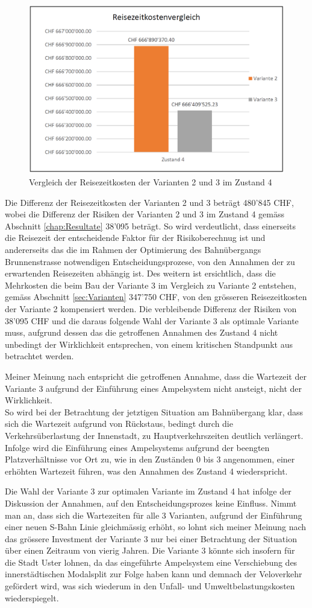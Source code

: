\begin{figure}[h!]
	\centering
	\includegraphics[width=.45\textwidth]{figures/f-06-07-ReisezeitVergleichV2_V3-Z0}
	\caption[Reisezeitkostenvergleich Variante 2 und 3 in Zustand 4]{Vergleich der Reisezeitkosten der Varianten 2 und 3 im Zustand 4}
	\label{img:ReisezeitkostenV2-V3-Z4}
\end{figure} 

Die Differenz der Reisezeitkosten der Varianten 2 und 3 beträgt 480'845 CHF, wobei die Differenz der Risiken der Varianten 2 und 3 im Zustand 4 gemäss Abschnitt \ref{chap:Resultate} 38'095 beträgt. So wird verdeutlicht, dass einerseits die Reisezeit der entscheidende Faktor für der Risikoberechnug ist und andererseits das die im Rahmen der Optimierung des Bahnübergangs Brunnenstrasse notwendigen Entscheidungsprozese, von den Annahmen der zu erwartenden Reisezeiten abhängig ist.
Des weitern ist ersichtlich, dass die Mehrkosten die beim Bau der Variante 3 im Vergleich zu Variante 2 entstehen, gemäss Abschnitt \ref{sec:Varianten} 347'750 CHF, von den grösseren Reisezeitkosten der Variante 2 kompensiert werden. Die verbleibende Differenz der Risiken von 38'095 CHF und die daraus folgende Wahl der Variante 3 als optimale Variante muss, aufgrund dessen das die getroffenen Annahmen des Zustand 4 nicht unbedingt der Wirklichkeit entsprechen, von einem kritischen Standpunkt aus betrachtet werden.

Meiner Meinung nach entspricht die getroffenen Annahme, dass die Wartezeit der Variante 3 aufgrund der Einführung eines Ampelsystem nicht ansteigt, nicht der Wirklichkeit. \\
So wird bei der Betrachtung der jetztigen Situation am Bahnübergang klar, dass sich die Wartezeit aufgrund von Rückstaus, bedingt durch die Verkehrsüberlastung der Innenstadt, zu Hauptverkehrszeiten deutlich verlängert. Infolge wird die Einführung eines Ampelsystems aufgrund der beengten Platzverhältnisse vor Ort zu, wie in den Zuständen 0 bis 3 angenommen, einer erhöhten Wartezeit führen, was den Annahmen des Zustand 4 wiederspricht.

Die Wahl der Variante 3 zur optimalen Variante im Zustand 4 hat infolge der Diskussion der Annahmen, auf den Entscheidungsprozes keine Einfluss.
Nimmt man an, dass sich die Wartezeiten für alle 3 Varianten, aufgrund der Einführung einer neuen S-Bahn Linie gleichmässig erhöht, so lohnt sich meiner Meinung nach das grössere Investment der Variante 3 nur bei einer Betrachtung der Situation über einen Zeitraum von vierig Jahren. Die Variante 3 könnte sich insofern für die Stadt Uster lohnen, da das eingeführte Ampelsystem eine Verschiebung des innerstädtischen Modalsplit zur Folge haben kann und demnach der Veloverkehr gefördert wird, was sich wiederum in den Unfall- und Umweltbelastungskosten wiederspiegelt.

